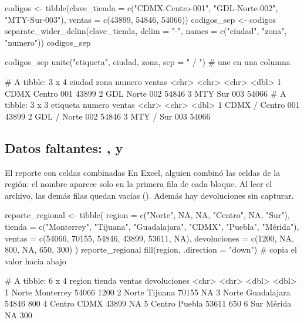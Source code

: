\begin{rcode}
codigos <- tibble(clave_tienda = c("CDMX-Centro-001", "GDL-Norte-002",
                                   "MTY-Sur-003"),
                  ventas = c(43899, 54846, 54066))
codigos_sep <- codigos %
  separate_wider_delim(clave_tienda, delim = "-",
                       names = c("ciudad", "zona", "numero"))
codigos_sep

codigos_sep %
  unite("etiqueta", ciudad, zona, sep = " / ")   # une en una columna
\end{rcode}
\begin{rsalida}
# A tibble: 3 x 4
  ciudad zona   numero ventas
  <chr>  <chr>  <chr>   <dbl>
1 CDMX   Centro 001     43899
2 GDL    Norte  002     54846
3 MTY    Sur    003     54066
# A tibble: 3 x 3
  etiqueta      numero ventas
  <chr>         <chr>   <dbl>
1 CDMX / Centro 001     43899
2 GDL / Norte   002     54846
3 MTY / Sur     003     54066
\end{rsalida}

\subsection{Datos faltantes: \texorpdfstring{}{fill()}, \texorpdfstring{}{replace\_na()} y \texorpdfstring{}{drop\_na()}}

\begin{ejemplo}{El reporte con celdas combinadas}
En Excel, alguien combinó las celdas de la región: el nombre aparece solo en
la primera fila de cada bloque. Al leer el archivo, las demás filas quedan
vacías (). Además hay devoluciones sin capturar.
\end{ejemplo}

\begin{rcode}
reporte_regional <- tibble(
  region      = c("Norte", NA, NA, "Centro", NA, "Sur"),
  tienda      = c("Monterrey", "Tijuana", "Guadalajara",
                  "CDMX", "Puebla", "Mérida"),
  ventas      = c(54066, 70155, 54846, 43899, 53611, NA),
  devoluciones = c(1200, NA, 800, NA, 650, 300)
)
reporte_regional %
  fill(region, .direction = "down")    # copia el valor hacia abajo
\end{rcode}
\begin{rsalida}
# A tibble: 6 x 4
  region tienda      ventas devoluciones
  <chr>  <chr>        <dbl>        <dbl>
1 Norte  Monterrey    54066         1200
2 Norte  Tijuana      70155           NA
3 Norte  Guadalajara  54846          800
4 Centro CDMX         43899           NA
5 Centro Puebla       53611          650
6 Sur    Mérida          NA          300
\end{rsalida}


